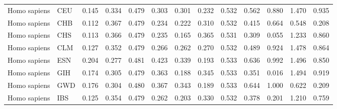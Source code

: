 \begin{longtable}{llrrrrrrrrrrr}
        Homo sapiens &                       CEU &                              0.145 &                               0.334 &                 0.479 &                 0.303 &                              0.301 &                               0.232 &                 0.532 &                 0.562 &        0.880 &  1.470 &  0.935 \\
        Homo sapiens &                       CHB &                              0.112 &                               0.367 &                 0.479 &                 0.234 &                              0.222 &                               0.310 &                 0.532 &                 0.415 &        0.664 &  0.548 &  0.208 \\
        Homo sapiens &                       CHS &                              0.113 &                               0.366 &                 0.479 &                 0.235 &                              0.165 &                               0.365 &                 0.531 &                 0.309 &        0.055 &  1.233 &  0.860 \\
        Homo sapiens &                       CLM &                              0.127 &                               0.352 &                 0.479 &                 0.266 &                              0.262 &                               0.270 &                 0.532 &                 0.489 &        0.924 &  1.478 &  0.864 \\
        Homo sapiens &                       ESN &                              0.204 &                               0.277 &                 0.481 &                 0.423 &                              0.339 &                               0.193 &                 0.533 &                 0.636 &        0.992 &  1.496 &  0.850 \\
        Homo sapiens &                       GIH &                              0.174 &                               0.305 &                 0.479 &                 0.363 &                              0.188 &                               0.345 &                 0.533 &                 0.351 &        0.016 &  1.494 &  0.919 \\
        Homo sapiens &                       GWD &                              0.176 &                               0.304 &                 0.480 &                 0.367 &                              0.343 &                               0.189 &                 0.533 &                 0.644 &        1.000 &  0.622 &  0.209 \\
        Homo sapiens &                       IBS &                              0.125 &                               0.354 &                 0.479 &                 0.262 &                              0.203 &                               0.330 &                 0.532 &                 0.378 &        0.201 &  1.210 &  0.759 \\

\end{longtable}
